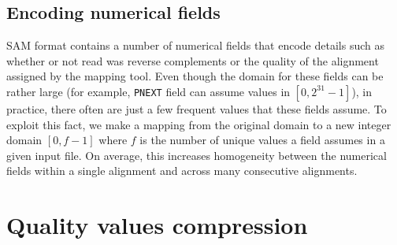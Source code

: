 \documentclass[12pt]{cmuthesis}
\begin{document}









  \subsection{Encoding numerical fields}

  SAM format contains a number of numerical fields that encode details such as whether or not read was reverse complements or the quality of the alignment assigned by the mapping tool. Even though the domain for these fields can be rather large (for example, \texttt{PNEXT} field can assume values in $[0, 2^{31}-1]$), in practice, there often are just a few frequent values that these fields assume. To exploit this fact, we make a mapping from the original domain to a new integer domain $[0, f - 1]$ where $f$ is the number of unique values a field assumes in a given input file. On average, this increases homogeneity between the numerical fields within a single alignment and across many consecutive alignments.

\section{Quality values compression}
\end{document}
